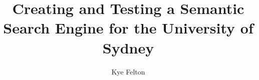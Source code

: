 \documentclass[logo]{style/usydthesis}
\begin{document}
\renewcommand{\thepage}{\roman{page}}	
\title{{\bf\Huge Creating and Testing a Semantic Search Engine for the University of Sydney}}
\author{Kye Felton}

\maketitle
{}





\setcounter{tocdepth}{2}
\newpage
\tableofcontents


\setcounter{page}{1}
\setcounter{chapter}{0}

\renewcommand{\thepage}{\arabic{page}}	
\setupParagraphs








% 
% 
\printbibliography

% 
\end{document}
